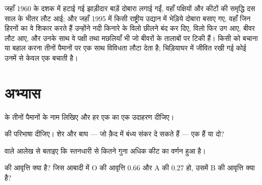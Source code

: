 \begin{example}[किसी हानि को पलटना]\label{ex:g10:biodiversity-scales:reversing}
जहाँ 1960 के दशक में हटाई गई झाड़ीदार बाड़ें दोबारा लगाई गईं, वहाँ पक्षियों
और कीटों की समृद्धि दस साल के भीतर लौट आई; और जहाँ 1995 में किसी राष्ट्रीय
उद्यान में भेड़िये दोबारा बसाए गए, वहाँ जिन हिरनों का वे शिकार करते हैं
उन्होंने नदी किनारे के विलो छीलने बंद कर दिए, विलो फिर उग आए, बीवर लौट
आए, और उनके साथ वे पक्षी तथा मछलियाँ भी जो बीवरों के तालाबों पर टिकी हैं।
किसी  को बचाना या बहाल करना तीनों पैमानों पर एक साथ विविधता लौटा
देता है; चिड़ियाघर में जीवित रखी गई कोई  उनमें से केवल एक बचाती है।
\end{example}

\section{अभ्यास}

\begin{exercise}[$\star$]\label{exo:g10:biodiversity-scales:1}
 के तीनों पैमानों के नाम लिखिए और हर एक का एक उदाहरण दीजिए।
\end{exercise}

\begin{exercise}[$\star$]\label{exo:g10:biodiversity-scales:2}
 की परिभाषा दीजिए। शेर और बाघ --- जो क़ैद में बंध्य संकर दे सकते
हैं --- एक  हैं या दो?
\end{exercise}

\begin{exercise}[$\star$]\label{exo:g10:biodiversity-scales:3}
 वाले आलेख से बताइए कि स्तनधारी  से कितने गुना अधिक
कीट  का वर्णन हुआ है।
\end{exercise}

\begin{exercise}[$\star$]\label{exo:g10:biodiversity-scales:4}
 की आवृत्ति क्या है? जिस आबादी में O  की आवृत्ति 0.66 और A
 की 0.27 हो, उसमें B की आवृत्ति क्या है?
\end{exercise}

